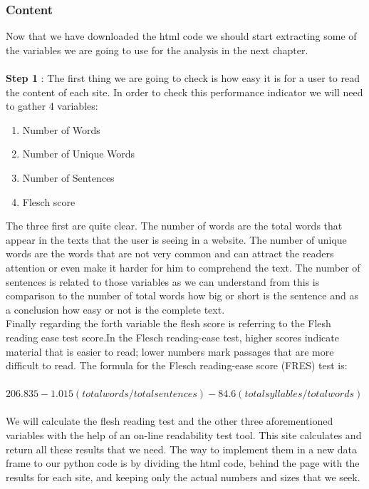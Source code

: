 \documentclass{article}
\begin{document}
\subsubsection{Content}\label{content}
Now that we have downloaded the html code we should start extracting some of the variables we are going to use for the analysis in the next chapter.\\\\
\textbf{Step 1} : The first thing we are going to check is how easy it is for a user to read the content of each site. In order to check this performance indicator we will need to gather 4 variables:
\begin{enumerate}
\item Number of Words
\item Number of Unique Words
\item Number of Sentences
\item Flesch score
\end{enumerate}
The three first are quite clear. The number of words are the total words that appear in the texts that the user is seeing in a website. The number of unique words are the words that are not very common and can attract the readers attention or even make it harder for him to comprehend the text. The number of sentences is related to those variables as we can understand from this is comparison to the number of total words how big or short is the sentence and as a conclusion how easy or not is the complete text.\\
Finally regarding the forth variable the flesh score is referring to the Flesh reading ease test score.In the Flesch reading-ease test, higher scores indicate material that is easier to read; lower numbers mark passages that are more difficult to read. The formula for the Flesch reading-ease score (FRES) test is:\\ \\
$206.835 - 1.015 (total words/total sentences) - 84.6 (total syllables/total words)$\\
\\
We will calculate the flesh reading test and the other three aforementioned variables with the help of an on-line readability test tool.\cite{key34} This site calculates and return all these results that we need. The way to implement them in a new data frame to our python code is by dividing the html code, behind the page with the results for each site, and keeping only the actual numbers and sizes that we seek. \\\\
\end{document}
